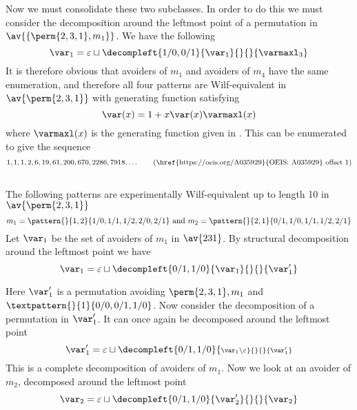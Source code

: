 Now we must consolidate these two subclasses. In order to do this we must
consider the decomposition around the leftmost point of a permutation in
\(\av{\{\perm{2,3,1},m_1\}}\). We have the following
\begin{equation*}
    \scriptvar_1 = \varepsilon \sqcup
    \decompleft{1/0,0/1}{\scriptvar_1}{}{}{\mathcal{\varmaxl}_3}
\end{equation*}
It is therefore obvious that avoiders of \(m_1\) and avoiders of \(m_4\)
have the same enumeration, and therefore all four patterns are Wilf-equivalent
in \(\av{\perm{2,3,1}}\) with generating function satisfying
\begin{equation*}
    \var(x) = 1 + x\var(x)\varmaxl(x)
\end{equation*}
where \(\varmaxl(x)\) is the generating function given in .
This can be enumerated to give the sequence
\begin{equation*}
    1, 1, 1, 2, 6, 19, 61, 200, 670, 2286, 7918,\dotsc \tag{\href{https://oeis.org/A035929}{OEIS: A035929} offset 1}
\end{equation*}

\subsection{}
\nextvar
The following patterns are experimentally Wilf-equivalent up to length 10 in
\(\av{\perm{2,3,1}}\)
\begin{equation*}
    m_1 = \pattern{}{1,2}{1/0,1/1,1/2,2/0,2/1} \text{ and }
    m_2 = \pattern{}{2,1}{0/1,1/0,1/1,1/2,2/1}
\end{equation*}
Let \(\scriptvar_1\) be the set of avoiders of \(m_1\) in \(\av{231}\). By structural decomposition
around the leftmost point we have
\begin{equation*}
    \scriptvar_1 = \varepsilon \sqcup
    \decompleft{0/1,1/0}{\scriptvar_1}{}{}{\scriptvar^\prime_1}
\end{equation*}

\noindent
Here \(\scriptvar^\prime_1\) is a permutation avoiding \(\perm{2,3,1}, m_1\)
and \(\textpattern{}{1}{0/0,0/1,1/0}\).
Now consider the decomposition of a permutation in \(\scriptvar^\prime_1\). It can
once again be decomposed around the leftmost point
\begin{equation*}
    \scriptvar^\prime_1 = \varepsilon \sqcup
    \decompleft{0/1,1/0}{\scriptstyle \scriptvar_1\setminus\varepsilon}{}{}{\scriptvar^\prime_1}
\end{equation*}
This is a complete decomposition of avoiders of \(m_1\). Now we
look at an avoider of \(m_2\), decomposed around the leftmost point
\begin{equation*}
    \scriptvar_2 = \varepsilon \sqcup
    \decompleft{0/1,1/0}{\scriptvar^\prime_2}{}{}{\scriptvar_2}
\end{equation*}

